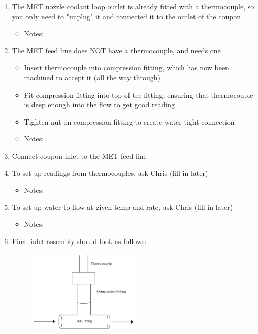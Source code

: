 \documentclass[11pt]{article}
\begin{document}
\begin{enumerate}
            \item The MET nozzle coolant loop outlet is already fitted with a thermocouple, so you only need to "unplug" it and connected it to the outlet of the coupon
            \begin{itemize}
                \item Notes: 
            \end{itemize}
            \item The MET feed line does NOT have a thermocouple, and needs one
            \begin{itemize}
                \item Insert thermocouple into compression fitting, which has now been machined to accept it (all the way through)
                \item Fit compression fitting into top of tee fitting, ensuring that thermocouple is deep enough into the flow to get good reading
                \item Tighten nut on compression fitting to create water tight connection
                \item Notes: 
            \end{itemize}
            \item Connect coupon inlet to the MET feed line
            \item To set up readings from thermocouples, ask Chris (fill in later)
            \begin{itemize}
                \item Notes: 
            \end{itemize}
            \item To set up water to flow at given temp and rate, ask Chris (fill in later)
            \begin{itemize}
                \item Notes: 
            \end{itemize}
            \item Final inlet assembly should look as follows: 
            \begin{figure}[h]
                \centering
                \includegraphics[width=0.5\textwidth]{fitting_assembly.jpeg}

\end{figure}
\end{enumerate}
\end{document}
